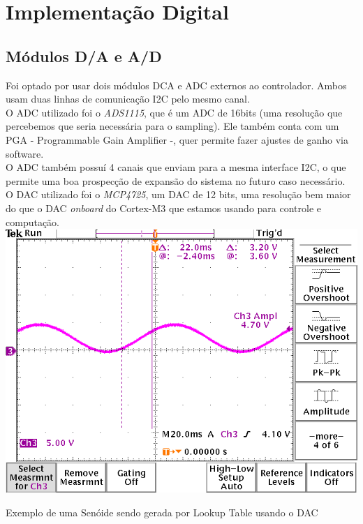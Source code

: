 \documentclass[12pt,a4paper]{report}
\begin{document}
	\chapter{Implementação Digital}
	
	\section{Módulos D/A e A/D}
	Foi optado por usar dois módulos DCA e ADC externos ao controlador. Ambos usam duas linhas de comunicação I2C pelo mesmo canal.\\
	
	O ADC utilizado foi o {\it ADS1115}, que é um ADC de 16bits (uma resolução que percebemos que seria necessária para o sampling). Ele também conta com um PGA - Programmable Gain Amplifier -, quer permite fazer ajustes de ganho via software.\\
	
	O ADC também possuí 4 canais que enviam para a mesma interface I2C, o que permite uma boa prospecção de expansão do sistema no futuro caso necessário.\\
	
	O DAC utilizado foi o {\it MCP4725}, um DAC de 12 bits, uma resolução bem maior do que o DAC {\it onboard} do Cortex-M3 que estamos usando para controle e computação.\\
	
	\includegraphics[scale = 0.5]{TEK00000}
	\begin{center}
		\footnotesize{Exemplo de uma Senóide sendo gerada por Lookup Table usando o DAC}
	\end{center}
\end{document}
